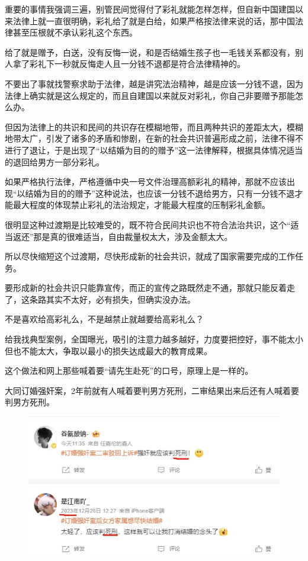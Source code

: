 \documentclass[UTF8,11pt,oneside]{ctexart}
\begin{document}


重要的事情我强调三遍，别管民间觉得付了彩礼就能怎样怎样，但自新中国建国以来法律上就一直很明确，彩礼给了就是白给，如果严格按法律来说的话，那中国法律甚至压根就不承认彩礼这个东西。

给了就是赠予，白送，没有反悔一说，和是否结婚生孩子也一毛钱关系都没有，别人拿了彩礼下一秒就反悔走人且一分钱不退都是符合法律精神的。

不要出了事就找警察求助于法律，越是讲究法治精神，越是应该一分钱不退，因为法律上确实就是这么规定的，而且自建国以来就反对彩礼，你自己非要赠予那能怎么办。

但因为法律上的共识和民间的共识存在模糊地带，而且两种共识的差距太大，模糊地带太广，引发了诸多的矛盾和惨剧，在新的社会共识普遍形成之前，法律不得不进行了退让，于是出现了“以结婚为目的的赠予”这一法律解释，根据具体情况适当的退回给男方一部分彩礼。

如果严格执行法律，严格遵循中央一号文件治理高额彩礼的精神，那就不应该出现“以结婚为目的的赠予”这种说法，也应该一分钱不退给男方，只有一分钱不退才能最大程度的体现禁止彩礼的法治规定，才能最大程度的压制彩礼金额。


很明显这种过渡期是比较难受的，既不符合民间共识也不符合法治共识，这个“适当返还”那是真的很难适当，自由裁量权太大，涉及金额太大。

所以尽快缩短这个过渡期，尽快形成新的社会共识，就成了国家需要完成的工作任务。

要形成新的社会共识只能靠宣传，而正的宣传之路既然走不通，那就只能反着走了，这条路其实不太好，必有损失，但确实没办法。


不是喜欢给高彩礼么，不是越禁止就越要给高彩礼么？

给我找典型案例，全国曝光，吸引的注意力越多越好，力度要把控好，事不能太小但也不能太大，争取以最小的损失达成最大的教育成果。

这个做法和网上那些喊着要“请先生赴死”的口号，原理上是一样的。

大同订婚强奸案，2年前就有人喊着要判男方死刑，二审结果出来后还有人喊着要判男方死刑。

\begin{figure}[H]
    \centering
    \includegraphics[width=13cm]{2025-04-17-011.png}
\end{figure}
\end{document}

